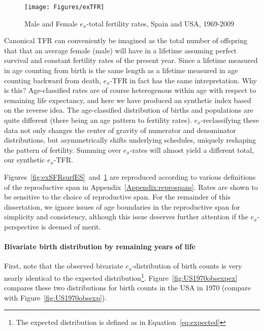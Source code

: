 \begin{figure}[ht!]
        \centering  
          \caption{Male and Female $e_x$-total fertility rates, Spain
          and USA, 1969-2009}
           \texttt{[image: Figures/exTFR]}
          \label{fig:exTFR}
\end{figure}

Canonical TFR can conveniently be imagined as the total number of
offspring that that an average female (male) will have in a lifetime assuming
perfect survival and constant fertility rates of the present year.
Since a lifetime measured in age counting from birth is the same length as a
lifetime measured in age counting backward from death, $e_x$-TFR in fact has the
same intrepretation. Why is this? Age-classified rates are of course
heterogenous within age with respect to remaining life expectancy, and here we have produced
an synthetic index based on the reverse idea. The age-classified
distribution of births and populations are quite different (there being an age
pattern to fertility rates). $e_x$-reclassifying these data not only changes the
center of gravity of numerator and denominator distributions, but asymmetrically
shifts underlying schedules, uniquely reshaping the pattern of
fertility. Summing over $e_x$-rates will almost yield a different total, our
synthetic $e_x$-TFR. 

Figures~\ref{fig:exSFRsurfES}~and~\ref{fig:exTFR} are reproduced according to
various definitions of the reproductive span in
Appendix~\ref{Appendix:reprospans}. Rates are shown to be sensitive to the
choice of reproductive span. For the remainder of this dissertation, we ignore
issues of age boundaries in the reproductive span for simplicity and
consistency, although this issue deserves further attention if the
$e_x$-perspective is deemed of merit.

\paragraph{Bivariate birth distribution by remaining years of life}

First, note that the observed bivariate $e_x$-distribution of birth counts is
very nearly identical to the expected distribution\footnote{The expected
distribution is defined as in Equation~\eqref{eq:expected}}.
Figure~\ref{fig:US1970obsexpex} compares these two distributions for birth counts in the USA in 1970 (compare with Figure~\ref{fig:US1970obsexp}). 

